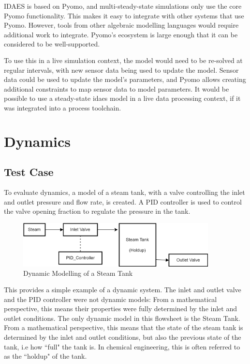 \documentclass[12pt]{article}
\begin{document}
IDAES is based on Pyomo, and multi-steady-state simulations only use the core Pyomo functionality. This makes it easy to integrate with other systems that use Pyomo. However, tools from other algebraic modelling languages would require additional work to integrate. Pyomo's ecosystem is large enough that it can be considered to be well-supported.


To use this in a live simulation context, the model would need to be re-solved at regular intervals, with new sensor data being used to update the model. Sensor data could be used to update the model's parameters, and Pyomo allows creating additional constraints to map sensor data to model parameters. It would be possible to use a steady-state idaes model in a live data processing context, if it was integrated into a process toolchain.


\section{Dynamics} \label{sec:dynamics}


\subsection{Test Case}

To evaluate dynamics, a model of a steam tank, with a valve controlling the inlet and outlet pressure and flow rate, is created. A PID controller is used to control the valve opening fraction to regulate the pressure in the tank.

\begin{figure}
    \includegraphics[width=0.9\textwidth]{../dynamicmodelling.png}
    \caption{Dynamic Modelling of a Steam Tank}
    \label{fig:dynamicmodelling}
\end{figure}

This provides a simple example of a dynamic system. The inlet and outlet valve and the PID controller were not dynamic models: From a mathematical perspective, this means their properties were fully determined by the inlet and outlet conditions. The only dynamic model in this flowsheet is the Steam Tank. From a mathematical perspective, this means that the state of the steam tank is determined by the inlet and outlet conditions, but also the previous state of the tank, i.e how ``full" the tank is. In chemical engineering, this is often referred to as the ``holdup" of the tank.
\end{document}
